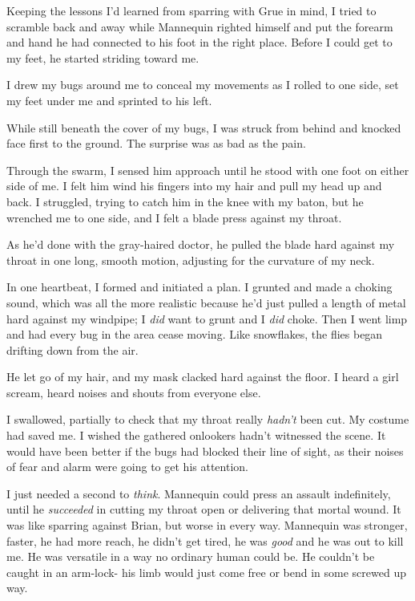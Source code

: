 Keeping the lessons I'd learned from sparring with Grue in mind, I tried to scramble back and away while Mannequin righted himself and put the forearm and hand he had connected to his foot in the right place.  Before I could get to my feet, he started striding toward me.



I drew my bugs around me to conceal my movements as I rolled to one side, set my feet under me and sprinted to his left.



While still beneath the cover of my bugs, I was struck from behind and knocked face first to the ground.  The surprise was as bad as the pain.



Through the swarm, I sensed him approach until he stood with one foot on either side of me.  I felt him wind his fingers into my hair and pull my head up and back.  I struggled, trying to catch him in the knee with my baton, but he wrenched me to one side, and I felt a blade press against my throat.



As he'd done with the gray-haired doctor, he pulled the blade hard against my throat in one long, smooth motion, adjusting for the curvature of my neck.



In one heartbeat, I formed and initiated a plan.  I grunted and made a choking sound, which was all the more realistic because he'd just pulled a length of metal hard against my windpipe; I \emph{did} want to grunt and I \emph{did }choke.  Then I went limp and had every bug in the area cease moving.  Like snowflakes, the flies began drifting down from the air.



He let go of my hair, and my mask clacked hard against the floor.  I heard a girl scream, heard noises and shouts from everyone else.



I swallowed, partially to check that my throat really \emph{hadn't} been cut.  My costume had saved me.  I wished the gathered onlookers hadn't witnessed the scene.  It would have been better if the bugs had blocked their line of sight, as their noises of fear and alarm were going to get his attention.



I just needed a second to \emph{think}.  Mannequin could press an assault indefinitely, until he \emph{succeeded }in cutting my throat open or delivering that mortal wound.  It was like sparring against Brian, but worse in every way.  Mannequin was stronger, faster, he had more reach, he didn't get tired, he was \emph{good }and he was out to kill me.  He was versatile in a way no ordinary human could be.  He couldn't be caught in an arm-lock- his limb would just come free or bend in some screwed up way.



